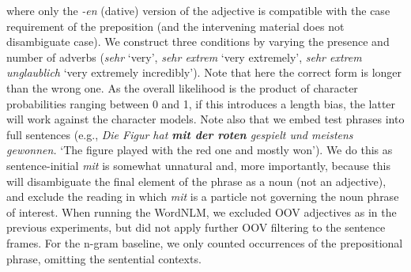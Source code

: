 where only the \emph{-en} (dative) version of the adjective is
compatible with the case requirement of the preposition (and the
intervening material does not disambiguate case). We construct three
conditions by varying the presence and number of adverbs (\emph{sehr}
`very', \emph{sehr extrem} `very extremely', \emph{sehr extrem
  unglaublich} `very extremely incredibly').  Note that here the
correct form is longer than the wrong one. As the overall likelihood
is the product of character probabilities ranging between 0 and 1, if
this introduces a length bias, the latter will work against the
character models. %
Note also that we embed test phrases into full sentences (e.g., \emph{Die Figur hat \textbf{mit der roten} gespielt und meistens gewonnen.} `The figure played with the red one and mostly won'). We
do this as sentence-initial \emph{mit} is somewhat unnatural and, more
importantly, because this will disambiguate the final element of the
phrase as a noun (not an adjective), and exclude the reading in which
\emph{mit} is a particle not governing the noun phrase of
interest. When running the WordNLM, we excluded OOV adjectives as in
the previous experiments, but did not apply further OOV filtering to
the sentence frames.  For the n-gram baseline, we
only counted occurrences of the prepositional phrase, omitting the
sentential contexts.



